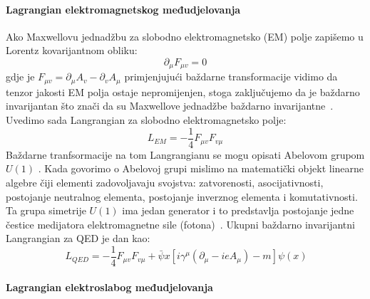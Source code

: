 \documentclass[12pt,a4paper,oneside]{article}
\begin{document}
\begin{linenumbers}
		\paragraph{Lagrangian elektromagnetskog međudjelovanja\newline} 
		Ako Maxwellovu jednadžbu za slobodno elektromagnetsko (EM) polje  zapišemo u Lorentz kovarijantnom obliku:
		\begin{equation}
		\partial_\mu F_{\mu v} = 0
		\end{equation}
		gdje je \begin{math}
		F_{\mu v} = \partial_\mu A_v - \partial_v A_\mu 
		\end{math}
		primjenjujući baždarne transformacije vidimo da tenzor jakosti EM polja ostaje nepromijenjen, stoga zaključujemo da je baždarno invarijantan što znači da su Maxwellove jednadžbe baždarno invarijantne~\cite{dokt2}. 
		Uvedimo sada Langrangian za slobodno elektromagnetsko polje:
		\begin{equation}
		L_{EM} = - \frac{1}{4} F_{\mu v} F_{v \mu}
		\end{equation}
		Baždarne tranfsormacije na tom Langrangianu se mogu opisati Abelovom grupom \begin{math}
		U(1)
		\end{math} . Kada govorimo o Abelovoj grupi mislimo na  matematički objekt linearne algebre čiji elementi zadovoljavaju svojstva: zatvorenosti, asocijativnosti, postojanje neutralnog elementa, postojanje inverznog elementa i komutativnosti.
		Ta grupa simetrije \begin{math}
		U(1)
		\end{math} ima jedan generator i to predstavlja postojanje jedne čestice medijatora elektromagnetne sile (fotona)~\cite{dokt2}.
		Ukupni baždarno invarijantni Langrangian za QED je dan kao: 
		\begin{equation}\
		L_{QED}= -\frac{1}{4} F_{\mu v} F_{v \mu} + \bar{\psi}x [i \gamma^\mu (\partial_\mu - i e A_\mu) -m]\psi(x)
		\end{equation}
		\paragraph{Lagrangian elektroslabog međudjelovanja\newline}
		

\end{linenumbers}
\end{document}

